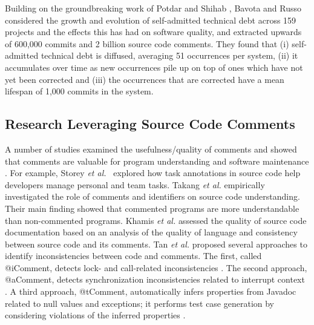 Building on the groundbreaking work of Potdar and Shihab \cite{ICSM_PotdarS14}, Bavota and Russo \cite{bavota2016large} considered the growth and evolution of self-admitted technical debt across 159 projects and the effects this has had on software quality, and extracted upwards of 600,000 commits and 2 billion source code comments. They found that (i) self-admitted technical debt is diffused, averaging 51 occurrences per system, (ii) it accumulates over time as new occurrences pile up on top of ones which have not yet been corrected and (iii) the occurrences that are corrected have a mean lifespan of 1,000 commits in the system.


\subsection{Research Leveraging Source Code Comments}


A number of studies examined the usefulness/quality of comments and showed that comments are valuable for program understanding and software maintenance \cite{TakangGM96,tan07icomment,lawrie2006leveraged}. For example, Storey \emph{et al.}~\cite{Storey:2008} explored how task annotations in source code help developers manage personal and team tasks. Takang {\em et al.} \cite{TakangGM96} empirically investigated the role of comments and identifiers on source code understanding. Their main finding showed that commented programs are more understandable than non-commented programs. Khamis {\em et al.} \cite{Khamis:2010} assessed the quality of source code documentation based on an analysis of the quality of language and consistency between source code and its comments. Tan {\em et al.} proposed several approaches to identify inconsistencies between code and comments. The first, called @iComment, detects lock- and call-related inconsistencies \cite{tan07icomment}. The second approach, @aComment, detects synchronization inconsistencies related to interrupt context \cite{acomment}. A third approach, @tComment, automatically infers properties from Javadoc related to null values and exceptions; it performs test case generation by considering violations of the inferred properties \cite{tcomment}.

